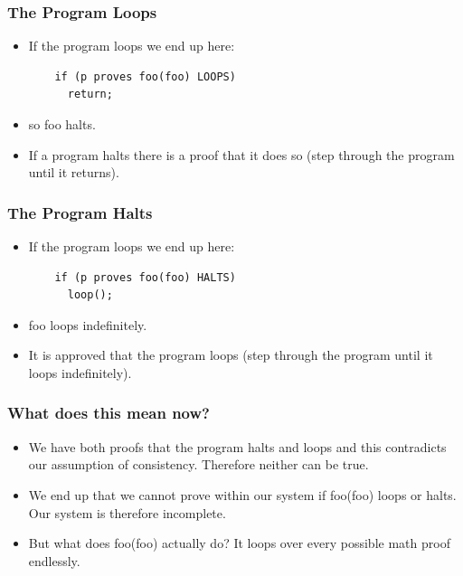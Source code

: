 \documentclass[aspectratio=169]{beamer}
\begin{document}
\begin{frame}[fragile]
	\frametitle{The Program Loops}
	\begin{itemize}
		\item If the program loops we end up here:
		\begin{center}
	  \begin{lstlisting}
    if (p proves foo(foo) LOOPS) 
      return;
   \end{lstlisting}
   	\end{center}
		\item so foo halts.
		\item If a program halts there is a proof that it does so (step through the program until it returns).
	\end{itemize}
\end{frame}

\begin{frame}[fragile]
	\frametitle{The Program Halts}
	\begin{itemize}
		\item If the program loops we end up here:
		\begin{center}
	  \begin{lstlisting}
    if (p proves foo(foo) HALTS)
      loop();
   \end{lstlisting}
   	\end{center}
		\item foo loops indefinitely.
		\item It is approved that the program loops (step through the program until it loops indefinitely).
	\end{itemize}
\end{frame}

\begin{frame}
	\frametitle{What does this mean now?}
	\begin{itemize}
		\item We have both proofs that the program halts and loops and this contradicts our assumption of consistency. Therefore neither can be true.
		\item We end up that we cannot prove within our system if foo(foo) loops or halts. Our system is therefore incomplete.
		\item But what does foo(foo) actually do? It loops over every possible math proof endlessly.
	\end{itemize}
\end{frame}
\end{document}
